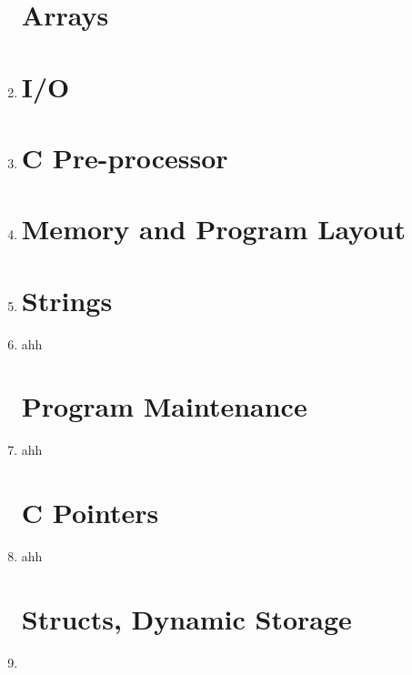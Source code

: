 \documentclass[11pt]{article}
\begin{document}
\begin{enumerate}
\section*{Arrays}
	
	\item 

\section*{I/O}

	\item 

\section*{C Pre-processor}

	\item 

\section*{Memory and Program Layout}

	\item 

\section*{Strings}

	\item ahh

\section*{Program Maintenance}

	\item ahh

\section*{C Pointers}

	\item ahh

\pagebreak
\section*{Structs, Dynamic Storage}

	\item 

\end{enumerate}
\end{document}
